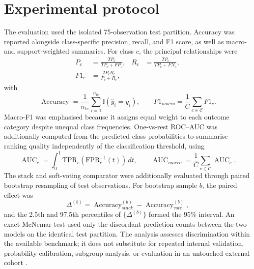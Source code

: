 \documentclass[a4paper,fleqn]{cas-dc}
\begin{document}
\section{Experimental protocol}
\label{sec:protocol}
The evaluation used the isolated 75-observation test partition. Accuracy was reported alongside class-specific precision, recall, and F1 score, as well as macro- and support-weighted summaries. For class $c$, the principal relationships were
\begin{equation}
\begin{aligned}
P_c&=\frac{TP_c}{TP_c+FP_c}, &
R_c&=\frac{TP_c}{TP_c+FN_c},\\
F1_c&=\frac{2P_cR_c}{P_c+R_c},
\end{aligned}
\label{eq:classmetrics}
\end{equation}
with
\begin{equation}
\operatorname{Accuracy}=\frac{1}{n_{te}}\sum_{i=1}^{n_{te}}\mathbb{I}(\hat y_i=y_i),
\qquad
F1_{macro}=\frac{1}{C}\sum_{c\in\mathcal{C}}F1_c.
\label{eq:aggregatemetrics}
\end{equation}
Macro-F1 was emphasised because it assigns equal weight to each outcome category despite unequal class frequencies. One-vs-rest ROC--AUC \cite{fawcett2006} was additionally computed from the predicted class probabilities to summarise ranking quality independently of the classification threshold, using
\begin{equation}
\operatorname{AUC}_c=\int_0^1 \mathrm{TPR}_c(\mathrm{FPR}_c^{-1}(t))\,dt,
\qquad
\operatorname{AUC}_{macro}=\frac{1}{C}\sum_{c\in\mathcal{C}}\operatorname{AUC}_c.
\label{eq:auc}
\end{equation}
The stack and soft-voting comparator were additionally evaluated through paired bootstrap resampling of test observations. For bootstrap sample $b$, the paired effect was
\begin{equation}
\Delta^{(b)}=\operatorname{Accuracy}^{(b)}_{stack}
-\operatorname{Accuracy}^{(b)}_{vote},
\label{eq:bootstrap}
\end{equation}
and the 2.5th and 97.5th percentiles of $\{\Delta^{(b)}\}$ formed the 95\% interval. An exact McNemar test used only the discordant prediction counts between the two models on the identical test partition. The analysis assesses discrimination within the available benchmark; it does not substitute for repeated internal validation, probability calibration, subgroup analysis, or evaluation in an untouched external cohort \cite{collins2024,riley2024,rileysample2024}.
\end{document}
